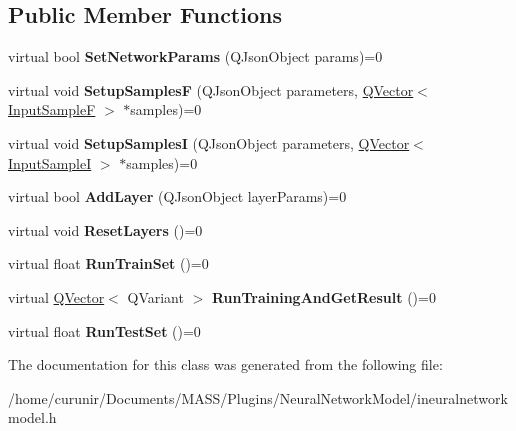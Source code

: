 \subsection*{Public Member Functions}
\begin{DoxyCompactItemize}
\item 
virtual bool {\bfseries Set\+Network\+Params} (Q\+Json\+Object params)=0\hypertarget{class_i_neural_network_model_1_1_i_neural_network_a21b05dafd766b32341d22b52d4714903}{}\label{class_i_neural_network_model_1_1_i_neural_network_a21b05dafd766b32341d22b52d4714903}

\item 
virtual void {\bfseries Setup\+SamplesF} (Q\+Json\+Object parameters, \hyperlink{class_q_vector}{Q\+Vector}$<$ \hyperlink{class_q_pair}{Input\+SampleF} $>$ $\ast$samples)=0\hypertarget{class_i_neural_network_model_1_1_i_neural_network_a840c7196b8c3e1065b8c0a62a1b49fb2}{}\label{class_i_neural_network_model_1_1_i_neural_network_a840c7196b8c3e1065b8c0a62a1b49fb2}

\item 
virtual void {\bfseries Setup\+SamplesI} (Q\+Json\+Object parameters, \hyperlink{class_q_vector}{Q\+Vector}$<$ \hyperlink{class_q_pair}{Input\+SampleI} $>$ $\ast$samples)=0\hypertarget{class_i_neural_network_model_1_1_i_neural_network_af04047a560d8b5f68651173f62510d02}{}\label{class_i_neural_network_model_1_1_i_neural_network_af04047a560d8b5f68651173f62510d02}

\item 
virtual bool {\bfseries Add\+Layer} (Q\+Json\+Object layer\+Params)=0\hypertarget{class_i_neural_network_model_1_1_i_neural_network_a128bb0ed83f4b3b309691943eca77954}{}\label{class_i_neural_network_model_1_1_i_neural_network_a128bb0ed83f4b3b309691943eca77954}

\item 
virtual void {\bfseries Reset\+Layers} ()=0\hypertarget{class_i_neural_network_model_1_1_i_neural_network_a0940ee0d739ae2ea00eb28ef21019597}{}\label{class_i_neural_network_model_1_1_i_neural_network_a0940ee0d739ae2ea00eb28ef21019597}

\item 
virtual float {\bfseries Run\+Train\+Set} ()=0\hypertarget{class_i_neural_network_model_1_1_i_neural_network_adbfcfb4e09800b0f32f141b071eca3d8}{}\label{class_i_neural_network_model_1_1_i_neural_network_adbfcfb4e09800b0f32f141b071eca3d8}

\item 
virtual \hyperlink{class_q_vector}{Q\+Vector}$<$ Q\+Variant $>$ {\bfseries Run\+Training\+And\+Get\+Result} ()=0\hypertarget{class_i_neural_network_model_1_1_i_neural_network_a4f00d2ce86d5e006f161762ad7631d3b}{}\label{class_i_neural_network_model_1_1_i_neural_network_a4f00d2ce86d5e006f161762ad7631d3b}

\item 
virtual float {\bfseries Run\+Test\+Set} ()=0\hypertarget{class_i_neural_network_model_1_1_i_neural_network_a767cdb2dfd88c7db1dfbd8620cffafc9}{}\label{class_i_neural_network_model_1_1_i_neural_network_a767cdb2dfd88c7db1dfbd8620cffafc9}

\end{DoxyCompactItemize}


The documentation for this class was generated from the following file\+:\begin{DoxyCompactItemize}
\item 
/home/curunir/\+Documents/\+M\+A\+S\+S/\+Plugins/\+Neural\+Network\+Model/ineuralnetworkmodel.\+h\end{DoxyCompactItemize}
